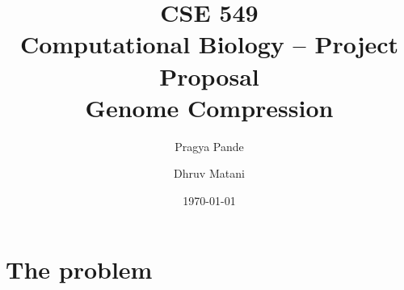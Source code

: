 \documentclass[11pt,twocolumn]{article}
\begin{document}
\title{CSE 549\\Computational Biology -- Project Proposal\\Genome Compression}
\author{Pragya Pande \and Dhruv Matani}
\date{\today}

\maketitle

\vspace{0.5in}

\section*{The problem}
\end{document}
